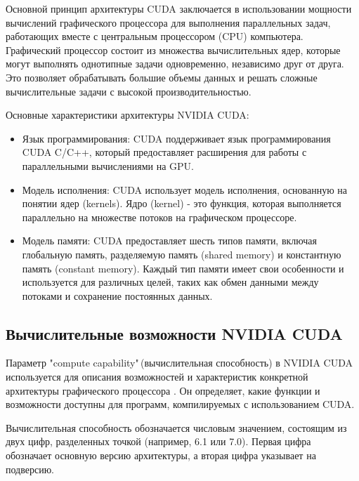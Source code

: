 \documentclass[a4paper, 12pt]{article}
\begin{document}
    Основной принцип архитектуры CUDA заключается в использовании мощности вычислений графического процессора для выполнения параллельных задач, работающих вместе с центральным процессором (CPU) компьютера. Графический процессор состоит из множества вычислительных ядер, которые могут выполнять однотипные задачи одновременно, независимо друг от друга. Это позволяет обрабатывать большие объемы данных и решать сложные вычислительные задачи с высокой производительностью.
    
    Основные характеристики архитектуры NVIDIA CUDA:
    \begin{itemize}
        \item Язык программирования: CUDA поддерживает язык программирования CUDA C/C++, который предоставляет расширения для работы с параллельными вычислениями на GPU. 
        \item Модель исполнения: CUDA использует модель исполнения, основанную на понятии ядер (kernels). Ядро (kernel) - это функция, которая выполняется параллельно на множестве потоков на графическом процессоре.
        \item Модель памяти: CUDA предоставляет шесть типов памяти, включая глобальную память, разделяемую память (shared memory) и константную память (constant memory). Каждый тип памяти имеет свои особенности и используется для различных целей, таких как обмен данными между потоками и сохранение постоянных данных.
    \end{itemize}
    \subsection{Вычислительные возможности NVIDIA CUDA}
    Параметр "compute capability"\,(вычислительная способность) в NVIDIA CUDA используется для описания возможностей и характеристик конкретной архитектуры графического процессора \cite{cuda_guide}. Он определяет, какие функции и возможности доступны для программ, компилируемых с использованием CUDA.
    
    Вычислительная способность обозначается числовым значением, состоящим из двух цифр, разделенных точкой (например, 6.1 или 7.0). Первая цифра обозначает основную версию архитектуры, а вторая цифра указывает на подверсию.
    
\end{document}
